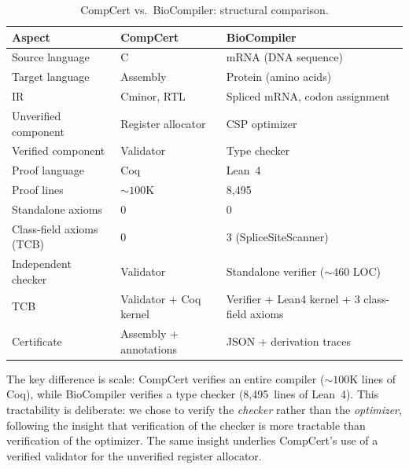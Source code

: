 \begin{table}[t]
\centering
\caption{CompCert vs.\ BioCompiler: structural comparison.}
\label{tab:compcert}
\begin{tabular}{lll}
\toprule
\textbf{Aspect} & \textbf{CompCert} & \textbf{BioCompiler} \\
\midrule
Source language & C & mRNA (DNA sequence) \\
Target language & Assembly & Protein (amino acids) \\
IR & Cminor, RTL & Spliced mRNA, codon assignment \\
Unverified component & Register allocator & CSP optimizer \\
Verified component & Validator & Type checker \\
Proof language & Coq & Lean~4 \\
Proof lines & ${\sim}100$K & 8{,}495 \\
Standalone axioms & 0 & 0 \\
Class-field axioms (TCB) & 0 & 3 (SpliceSiteScanner) \\
Independent checker & Validator & Standalone verifier (${\sim}460$ LOC) \\
TCB & Validator + Coq kernel & Verifier + Lean4 kernel + 3 class-field axioms \\
Certificate & Assembly + annotations & JSON + derivation traces \\
\bottomrule
\end{tabular}
\end{table}

The key difference is scale: CompCert verifies an entire compiler
(${\sim}100$K lines of Coq), while BioCompiler verifies a type checker
(8{,}495~lines of Lean~4).
This tractability is deliberate: we chose to verify the \emph{checker}
rather than the \emph{optimizer}, following the insight that
verification of the checker is more tractable than verification of the
optimizer.
The same insight underlies CompCert's use of a verified validator for
the unverified register allocator.

